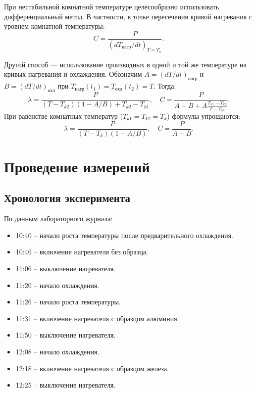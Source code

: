 \documentclass[a4paper,12pt]{article}
\begin{document}
При нестабильной комнатной температуре целесообразно использовать дифференциальный метод. В частности, в точке пересечения кривой нагревания с уровнем комнатной температуры:
\begin{equation}
    C = \frac{P}{(dT_{\text{нагр}}/dt)_{T=T_k}}.
    \label{eq:diff_C}
\end{equation}

Другой способ — использование производных в одной и той же температуре на кривых нагревания и охлаждения. Обозначим $A = (dT/dt)_{\text{нагр}}$ и $B = (dT/dt)_{\text{охл}}$ при $T_{\text{нагр}}(t_1) = T_{\text{охл}}(t_2) = T$. Тогда:
\begin{equation}
    \lambda = \frac{P}{(T - T_{k2})(1 - A/B) + T_{k2} - T_{k1}}, \quad
    C = \frac{P}{A - B + A \frac{T_{k1} - T_{k2}}{T - T_{k1}}}.
    \label{eq:diff_lambda_C}
\end{equation}
При равенстве комнатных температур ($T_{k1} = T_{k2} = T_k$) формулы упрощаются:
\begin{equation}
    \lambda = \frac{P}{(T - T_k)(1 - A/B)}, \quad
    C = \frac{P}{A - B}.
    \label{eq:diff_simple}
\end{equation}

\section{Проведение измерений}

\subsection{Хронология эксперимента}
По данным лабораторного журнала:
\begin{itemize}
    \item 10:40 – начало роста температуры после предварительного охлаждения.
    \item 10:46 – включение нагревателя без образца.
    \item 11:06 – выключение нагревателя.
    \item 11:20 – начало охлаждения.
    \item 11:26 – начало роста температуры.
    \item 11:31 – включение нагревателя с образцом алюминия.
    \item 11:50 – выключение нагревателя.
    \item 12:08 – начало охлаждения.
    \item 12:18 – включение нагревателя с образцом железа.
    \item 12:25 – выключение нагревателя.
\end{itemize}
\end{document}
